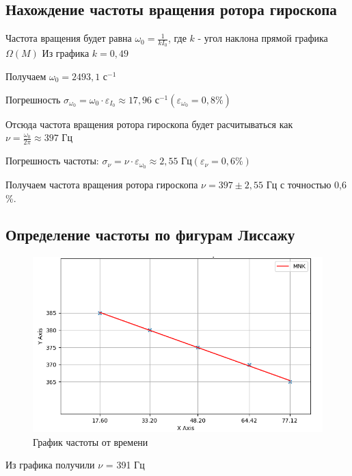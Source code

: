 \documentclass[a4paper]{article}
\begin{document}
\subsection{Нахождение частоты вращения ротора гироскопа}

Частота вращения будет равна $\omega_{0} = \frac{1}{kI_{0}}$, где $k$ - угол наклона прямой графика $\Omega(M)$
Из графика $k = 0,49$

Получаем $\omega_{0} = 2493,1 \text{ с}^{-1}$

Погрешность $\sigma_{\omega_{0}} = \omega_{0} \cdot \varepsilon_{I_{0}} \approx 17,96 \text{ с}^{-1} (\varepsilon_{\omega_{0}} = 0,8\%)$

Отсюда частота вращения ротора гироскопа будет расчитываться как $\nu = \frac{\omega_{0}}{2\pi} \approx 397 \text{ Гц}$

Погрешность частоты: $\sigma_{\nu} = \nu \cdot \varepsilon_{\omega_{0}} \approx 2,55 \text{ Гц}(\varepsilon_{\nu} = 0,6\%) $

Получаем частота вращения ротора гироскопа $\nu = 397 \pm 2,55 \text{ Гц}$ с точностью 0,6 \%.
\newpage

\subsection{Определение частоты по фигурам Лиссажу}

\begin{figure}[h!]
    \centering
    \includegraphics[width=1\textwidth]{pick4}
    \caption{График частоты от времени}
\end{figure}

Из графика получили $\nu $ = 391 Гц
\end{document}
